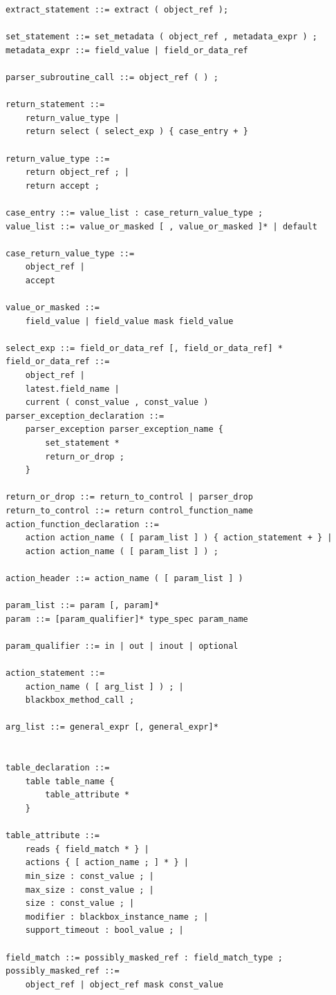 \documentclass[12pt]{article}
\begin{document}
\begin{lstlisting}[style=BNFstyle]
extract_statement ::= extract ( object_ref ); 

set_statement ::= set_metadata ( object_ref , metadata_expr ) ;
metadata_expr ::= field_value | field_or_data_ref

parser_subroutine_call ::= object_ref ( ) ; 

return_statement ::=
    return_value_type |
    return select ( select_exp ) { case_entry + }

return_value_type ::= 
    return object_ref ; | 
    return accept ;

case_entry ::= value_list : case_return_value_type ;
value_list ::= value_or_masked [ , value_or_masked ]* | default

case_return_value_type ::= 
    object_ref | 
    accept

value_or_masked ::=
    field_value | field_value mask field_value

select_exp ::= field_or_data_ref [, field_or_data_ref] * 
field_or_data_ref ::=
    object_ref |
    latest.field_name |
    current ( const_value , const_value )
parser_exception_declaration ::=
    parser_exception parser_exception_name {
        set_statement *
        return_or_drop ;
    }

return_or_drop ::= return_to_control | parser_drop
return_to_control ::= return control_function_name
action_function_declaration ::=
    action action_name ( [ param_list ] ) { action_statement + } |
    action action_name ( [ param_list ] ) ;

action_header ::= action_name ( [ param_list ] )

param_list ::= param [, param]*
param ::= [param_qualifier]* type_spec param_name

param_qualifier ::= in | out | inout | optional

action_statement ::= 
    action_name ( [ arg_list ] ) ; |
    blackbox_method_call ;

arg_list ::= general_expr [, general_expr]*


table_declaration ::=
    table table_name {
        table_attribute *
    }

table_attribute ::=
    reads { field_match * } |
    actions { [ action_name ; ] * } |
    min_size : const_value ; |
    max_size : const_value ; |
    size : const_value ; |
    modifier : blackbox_instance_name ; |
    support_timeout : bool_value ; |

field_match ::= possibly_masked_ref : field_match_type ;
possibly_masked_ref ::= 
    object_ref | object_ref mask const_value


\end{lstlisting}
\end{document}
